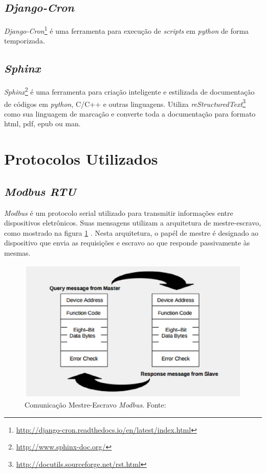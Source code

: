     \subsection{\textit{Django-Cron}}
    \textit{Django-Cron}\footnote{\url{http://django-cron.readthedocs.io/en/latest/index.html}} é uma ferramenta para execução de \textit{scripts} em \textit{python} de forma temporizada.

    \subsection{\textit{Sphinx}}
    \textit{Sphinx}\footnote{\url{http://www.sphinx-doc.org/}} é uma ferramenta para criação inteligente e estilizada de documentação de códigos em \textit{python}, C/C++
    e outras linguagens. Utiliza \textit{reStructuredText}\footnote{\url{http://docutils.sourceforge.net/rst.html}} como sua linguagem de marcação e converte toda a documentação para formato html, pdf, epub ou man.

\section{Protocolos Utilizados}
    \subsection{\textit{Modbus RTU}}
    \textit{Modbus} é um protocolo serial utilizado para transmitir informações entre dispositivos eletrônicos. Suas mensagens utilizam a arquitetura de mestre-escravo, como mostrado na figura \ref{mestre_escravo} \cite{modbus}. Nesta arquitetura, o papél de mestre é designado ao dispositivo que envia as requisições e escravo ao que responde passivamente às mesmas.

    \begin{figure}[!htpb]
        \centering
        \includegraphics[keepaspectratio=true,scale=0.8]{figuras/mestre_escravo.eps}
        \caption{Comunicação Mestre-Escravo \textit{Modbus}. Fonte: \cite{modbus}}
        \label{mestre_escravo}
    \end{figure}

